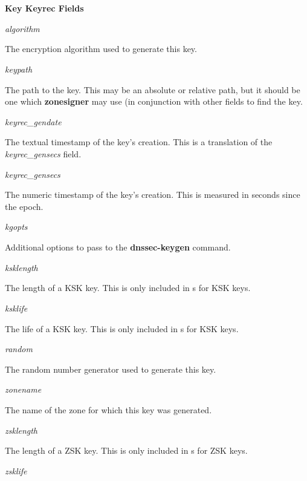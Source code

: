 {\bf Key Keyrec Fields}

\begin{description}

\item {\it algorithm}\verb" "

The encryption algorithm used to generate this key.

\item {\it keypath}\verb" "

The path to the key.  This may be an absolute or relative path, but it should
be one which {\bf zonesigner} may use (in conjunction with other 
fields to find the key.

\item {\it keyrec\_gendate}\verb" "

The textual timestamp of the key's creation.  This is a translation of
the {\it keyrec\_gensecs} field.

\item {\it keyrec\_gensecs}\verb" "

The numeric timestamp of the key's creation.  This is measured in seconds
since the epoch.

\item {\it kgopts}\verb" "

Additional options to pass to the {\bf dnssec-keygen} command.

\item {\it ksklength}\verb" "

The length of a KSK key.  This is only included in s for KSK keys.

\item {\it ksklife}\verb" "

The life of a KSK key.  This is only included in s for KSK keys.

\item {\it random}\verb" "

The random number generator used to generate this key.

\item {\it zonename}\verb" "

The name of the zone for which this key was generated.

\item {\it zsklength}\verb" "

The length of a ZSK key.  This is only included in s for ZSK
keys.

\item {\it zsklife}\verb" "

\end{description}

